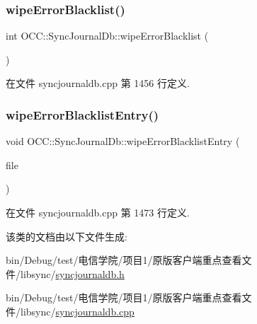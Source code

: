 \subsubsection{\texorpdfstring{wipe\+Error\+Blacklist()}{wipeErrorBlacklist()}}
{\footnotesize\ttfamily int O\+C\+C\+::\+Sync\+Journal\+Db\+::wipe\+Error\+Blacklist (\begin{DoxyParamCaption}{ }\end{DoxyParamCaption})}



在文件 syncjournaldb.\+cpp 第 1456 行定义.

\mbox{\label{class_o_c_c_1_1_sync_journal_db_acc9083fdf5df19c2ed20f1bc8f907e78}} 
\subsubsection{\texorpdfstring{wipe\+Error\+Blacklist\+Entry()}{wipeErrorBlacklistEntry()}}
{\footnotesize\ttfamily void O\+C\+C\+::\+Sync\+Journal\+Db\+::wipe\+Error\+Blacklist\+Entry (\begin{DoxyParamCaption}\item[{const Q\+String \&}]{file }\end{DoxyParamCaption})}



在文件 syncjournaldb.\+cpp 第 1473 行定义.



该类的文档由以下文件生成\+:\begin{DoxyCompactItemize}
\item 
bin/\+Debug/test/电信学院/项目1/原版客户端重点查看文件/libsync/\hyperlink{syncjournaldb_8h}{syncjournaldb.\+h}\item 
bin/\+Debug/test/电信学院/项目1/原版客户端重点查看文件/libsync/\hyperlink{syncjournaldb_8cpp}{syncjournaldb.\+cpp}\end{DoxyCompactItemize}
